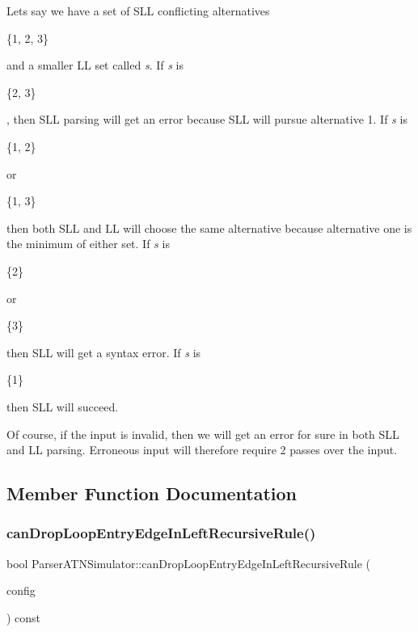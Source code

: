 Let\textquotesingle{}s say we have a set of S\+LL conflicting alternatives
\begin{DoxyCode}
\{1, 2, 3\} 
\end{DoxyCode}
 and a smaller LL set called {\itshape s}. If {\itshape s} is
\begin{DoxyCode}
\{2, 3\} 
\end{DoxyCode}
 , then S\+LL parsing will get an error because S\+LL will pursue alternative 1. If {\itshape s} is
\begin{DoxyCode}
\{1, 2\} 
\end{DoxyCode}
 or
\begin{DoxyCode}
\{1, 3\} 
\end{DoxyCode}
 then both S\+LL and LL will choose the same alternative because alternative one is the minimum of either set. If {\itshape s} is
\begin{DoxyCode}
\{2\} 
\end{DoxyCode}
 or
\begin{DoxyCode}
\{3\} 
\end{DoxyCode}
 then S\+LL will get a syntax error. If {\itshape s} is
\begin{DoxyCode}
\{1\} 
\end{DoxyCode}
 then S\+LL will succeed.

Of course, if the input is invalid, then we will get an error for sure in both S\+LL and LL parsing. Erroneous input will therefore require 2 passes over the input.

\subsection{Member Function Documentation}
\mbox{\label{classantlr4_1_1atn_1_1ParserATNSimulator_a3212501674dd0323d4875461304d976c}} 
\subsubsection{\texorpdfstring{can\+Drop\+Loop\+Entry\+Edge\+In\+Left\+Recursive\+Rule()}{canDropLoopEntryEdgeInLeftRecursiveRule()}}
{\footnotesize\ttfamily bool Parser\+A\+T\+N\+Simulator\+::can\+Drop\+Loop\+Entry\+Edge\+In\+Left\+Recursive\+Rule (\begin{DoxyParamCaption}\item[{\hyperlink{classantlr4_1_1atn_1_1ATNConfig}{A\+T\+N\+Config} $\ast$}]{config }\end{DoxyParamCaption}) const}

